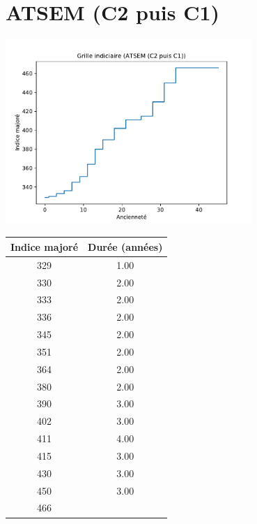 \newpage 
 
\chapter{ATSEM (C2 puis C1)} 

\begin{minipage}{0.55\linewidth}\includegraphics[width=0.7\textwidth]{fig/grille_ATSEM.pdf}\end{minipage} 
\begin{minipage}{0.3\linewidth} 
 \begin{center} 

\begin{tabular}[htb]{|c|c|} 
\hline 
 Indice majoré &  Durée (années) \\ 
\hline \hline 
 329 &  1.00 \\ 
\hline 
 330 &  2.00 \\ 
\hline 
 333 &  2.00 \\ 
\hline 
 336 &  2.00 \\ 
\hline 
 345 &  2.00 \\ 
\hline 
 351 &  2.00 \\ 
\hline 
 364 &  2.00 \\ 
\hline 
 380 &  2.00 \\ 
\hline 
 390 &  3.00 \\ 
\hline 
 402 &  3.00 \\ 
\hline 
 411 &  4.00 \\ 
\hline 
 415 &  3.00 \\ 
\hline 
 430 &  3.00 \\ 
\hline 
 450 &  3.00 \\ 
\hline 
 466 &   \\ 
\hline 
\hline 
\end{tabular} 
\end{center} 
 \end{minipage} 


